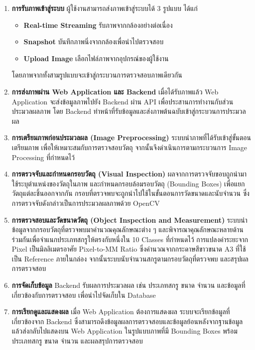 \begin{enumerate}                                                                                                              
    \item \textbf{การรับภาพเข้าสู่ระบบ} 
          ผู้ใช้งานสามารถส่งภาพเข้าสู่ระบบได้ 3 รูปแบบ ได้แก่ 
          \begin{itemize}                                                                                                              
              \item \textbf{Real-time Streaming} รับภาพจากกล้องอย่างต่อเนื่อง
              \item \textbf{Snapshot} บันทึกภาพนิ่งจากกล้องเพื่อนำไปตรวจสอบ
              \item \textbf{Upload Image} เลือกไฟล์ภาพจากอุปกรณ์ของผู้ใช้งาน
          \end{itemize}
          โดยภาพจากทั้งสามรูปแบบจะเข้าสู่กระบวนการตรวจสอบภาพเดียวกัน
          
    \item \textbf{การส่งภาพผ่าน Web Application และ Backend} เมื่อได้รับภาพแล้ว Web Application จะส่งข้อมูลภาพไปยัง Backend ผ่าน API เพื่อประสานการทำงานกับส่วนประมวลผลภาพ โดย Backend ทำหน้าที่รับข้อมูลและส่งภาพต้นฉบับเข้าสู่กระบวนการประมวลผล
          
    \item \textbf{การเตรียมภาพก่อนประมวลผล (Image Preprocessing)} ระบบนำภาพที่ได้รับเข้าสู่ขั้นตอนเตรียมภาพ เพื่อให้เหมาะสมกับการตรวจสอบวัตถุ จากนั้นจึงดำเนินการตามกระบวนการ Image Processing ที่กำหนดไว้
          
    \item \textbf{การตรวจจับและกำหนดกรอบวัตถุ (Visual Inspection)} ผลจากการตรวจจับขอบถูกนำมาใช้ระบุตำแหน่งของวัตถุในภาพ และกำหนดกรอบล้อมรอบวัตถุ (Bounding Boxes) เพื่อแยกวัตถุแต่ละชิ้นออกจากกัน กรอบที่ตรวจพบจะถูกนำไปใช้ในขั้นตอนการวัดขนาดและนับจำนวน ซึ่งการตรวจจับดังกล่าวเป็นการประมวลผลภาพด้วย OpenCV
          
    \item \textbf{การตรวจสอบและวัดขนาดวัตถุ (Object Inspection and Measurement)} ระบบนำข้อมูลจากกรอบวัตถุที่ตรวจพบมาคำนวณคุณลักษณะต่าง ๆ และพิจารณาคุณลักษณะหลายด้านร่วมกันเพื่อจำแนกประเภทสกรูให้ตรงกับหนึ่งใน 10 Classes ที่กำหนดไว้ การแปลงค่าระยะจาก Pixel เป็นมิลลิเมตรอาศัย Pixel-to-MM Ratio ซึ่งคำนวณจากกระดาษสีขาวขนาด A3 ที่ใช้เป็น Reference ภายในกล่อง จากนั้นระบบนับจำนวนสกรูตามกรอบวัตถุที่ตรวจพบ และสรุปผลการตรวจสอบ
          
    \item \textbf{การจัดเก็บข้อมูล} Backend รับผลการประมวลผล เช่น ประเภทสกรู ขนาด จำนวน และข้อมูลที่เกี่ยวข้องกับการตรวจสอบ เพื่อนำไปจัดเก็บใน Database
          
    \item \textbf{การเรียกดูและแสดงผล} เมื่อ Web Application ต้องการแสดงผล ระบบจะเรียกข้อมูลที่เกี่ยวข้องจาก Backend ซึ่งสามารถดึงข้อมูลผลการตรวจสอบและข้อมูลย้อนหลังจากฐานข้อมูล แล้วส่งกลับไปแสดงบน Web Application ในรูปแบบภาพที่มี Bounding Boxes พร้อมประเภทสกรู ขนาด จำนวน และผลสรุปการตรวจสอบ
\end{enumerate}

